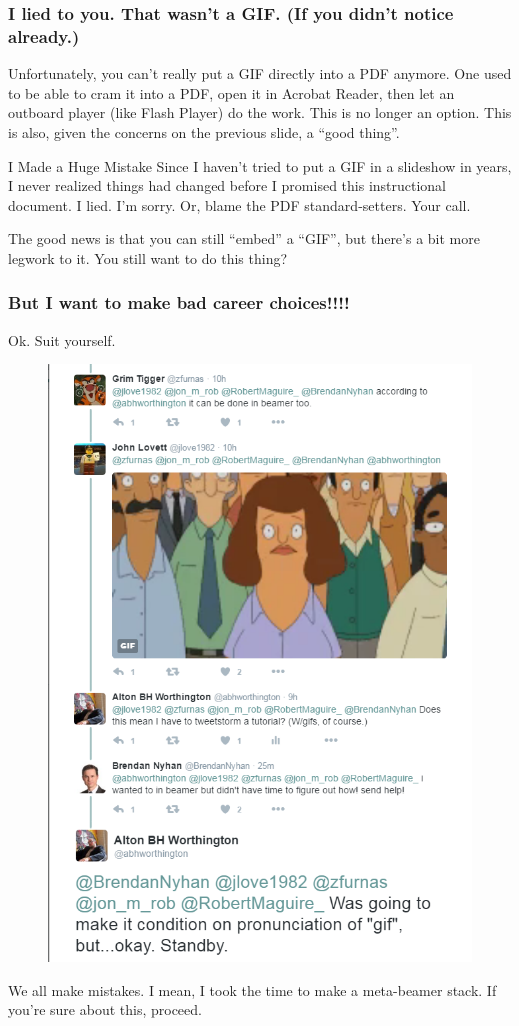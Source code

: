 \documentclass{beamer}
\begin{document}
\begin{frame}
	\frametitle{I lied to you. That wasn't a GIF. (If you didn't notice already.)}
	Unfortunately, you can't really put a GIF directly into a PDF anymore. One used to be able to cram it into a PDF, open it in Acrobat Reader, then let an outboard player (like Flash Player) do the work. This is no longer an option. This is also, given the concerns on the previous slide, a ``good thing''.
	\begin{block}{I Made a Huge Mistake}
		Since I haven't tried to put a GIF in a slideshow in years, I never realized things had changed before I promised this instructional document. I lied. I'm sorry. Or, blame the PDF standard-setters. Your call.
	\end{block}
	The good news is that you can still ``embed'' a ``GIF'', but there's a bit more legwork to it. You still want to do this thing?
\end{frame}

\begin{frame}
	\frametitle{But I want to make bad career choices!!!!}
	Ok. Suit yourself.
	\begin{figure}
		\centering
		\includegraphics[scale=.25]{figures/genesis.PNG}
	\end{figure}
	We all make mistakes. \pause I mean, I took the time to make a meta-beamer stack. If you're sure about this, proceed.
\end{frame}
\end{document}
